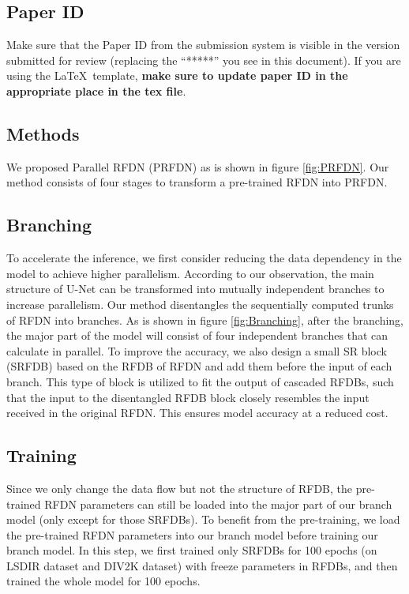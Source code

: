 \documentclass[10pt,twocolumn,letterpaper]{article}
\begin{document}
\subsection{Paper ID}
Make sure that the Paper ID from the submission system is visible in the version submitted for review (replacing the ``*****'' you see in this document).
If you are using the \LaTeX\ template, \textbf{make sure to update paper ID in the appropriate place in the tex file}.


\subsection{Methods}

We proposed Parallel RFDN (PRFDN) as is shown in figure \ref{fig:PRFDN}.
Our method consists of four stages to transform a pre-trained RFDN\cite{liu2020residual} into PRFDN.

\subsection{Branching}
To accelerate the inference, we first consider reducing the data dependency in the model to achieve higher parallelism. 
According to our observation, the main structure of U-Net can be transformed into mutually independent branches to increase parallelism. 
Our method disentangles the sequentially computed trunks of RFDN into branches. 
As is shown in figure \ref{fig:Branching}, after the branching, the major part of the model will consist of four independent branches that can calculate in parallel. 
To improve the accuracy, we also design a small SR block (SRFDB) based on the RFDB of RFDN and add them before the input of each branch. 
This type of block is utilized to fit the output of cascaded RFDBs, such that the input to the disentangled RFDB block closely resembles the input received in the original RFDN.
This ensures model accuracy at a reduced cost.

\subsection{Training}
Since we only change the data flow but not the structure of RFDB, the pre-trained RFDN parameters can still be loaded into the major part of our branch model (only except for those SRFDBs). 
To benefit from the pre-training, we load the pre-trained RFDN parameters into our branch model before training our branch model.
In this step, we first trained only SRFDBs for 100 epochs (on LSDIR dataset and DIV2K dataset) with freeze parameters in RFDBs, and then trained the whole model for 100 epochs.
\end{document}
